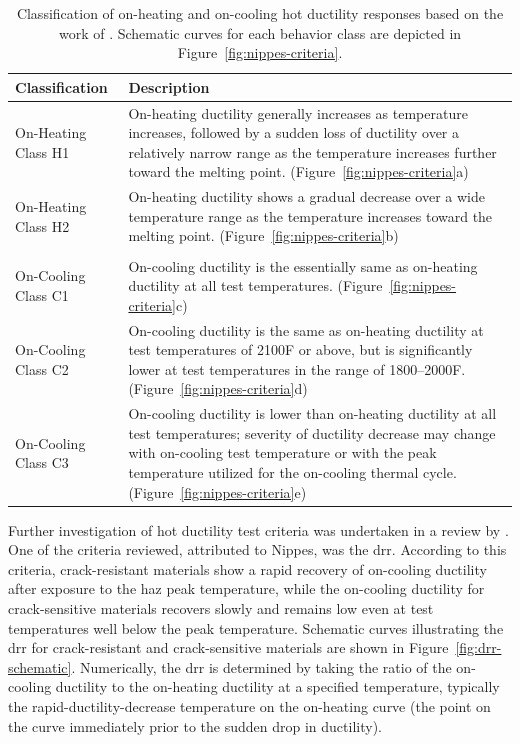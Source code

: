 \begin{table}[h]
\caption{Classification of on-heating and on-cooling hot ductility responses based on the work of \citet{nippes_further_1957}. Schematic curves for each behavior class are depicted in Figure~\ref{fig:nippes-criteria}.}
\begin{tabular}{ lp{4in} }
\toprule
\textbf{Classification} & \textbf{Description} \\
\midrule
On-Heating Class H1 & On-heating ductility generally increases as temperature increases, followed by a sudden loss of ductility over a relatively narrow range as the temperature increases further toward the melting point. (Figure~\ref{fig:nippes-criteria}a) \\
\addlinespace
On-Heating Class H2 & On-heating ductility shows a gradual decrease over a wide temperature range as the temperature increases toward the melting point. (Figure~\ref{fig:nippes-criteria}b) \\
& \\
On-Cooling Class C1 & On-cooling ductility is the essentially same as on-heating ductility at all test temperatures. (Figure~\ref{fig:nippes-criteria}c) \\
\addlinespace
On-Cooling Class C2 & On-cooling ductility is the same as on-heating ductility at test temperatures of 2100\textdegree{}F or above, but is significantly lower at test temperatures in the range of 1800--2000\textdegree{}F. (Figure~\ref{fig:nippes-criteria}d) \\
\addlinespace
On-Cooling Class C3 & On-cooling ductility is lower than on-heating ductility at all test temperatures; severity of ductility decrease may change with on-cooling test temperature or with the peak temperature utilized for the on-cooling thermal cycle. (Figure~\ref{fig:nippes-criteria}e) \\
\bottomrule
\end{tabular}
\label{tab:nippes-classification}
\end{table}


Further investigation of hot ductility test criteria was undertaken in a review by \citet{yeniscavich_correlation_1970}. One of the criteria reviewed, attributed to Nippes, was the \gls{drr}. According to this criteria, crack-resistant materials show a rapid recovery of on-cooling ductility after exposure to the \gls{haz} peak temperature, while the on-cooling ductility for crack-sensitive materials recovers slowly and remains low even at test temperatures well below the peak temperature. Schematic curves illustrating the \gls{drr} for crack-resistant and crack-sensitive materials are shown in Figure~\ref{fig:drr-schematic}. Numerically, the \gls{drr} is determined by taking the ratio of the on-cooling ductility to the on-heating ductility at a specified temperature, typically the rapid-ductility-decrease temperature on the on-heating curve (the point on the curve immediately prior to the sudden drop in ductility).

